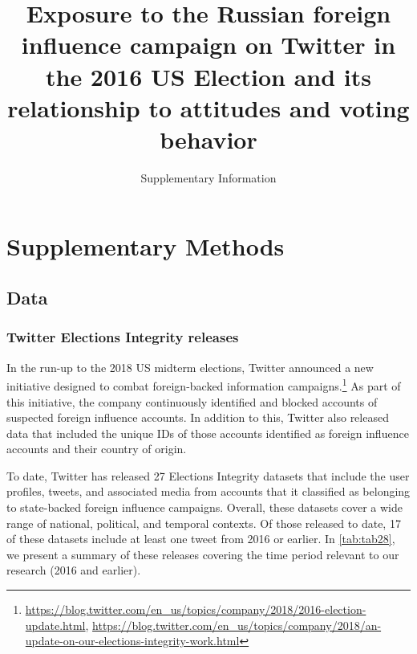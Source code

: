 \documentclass[
  12pt,
]{article}
\title{\Large \textbf{Exposure to the Russian foreign influence campaign on Twitter in the 2016 US Election and its relationship to attitudes and voting behavior}\vspace{2mm}}
\subtitle{\Large Supplementary Information}
\author{}
\date{\vspace{-2.5em}}
\begin{document}
\maketitle

{
\hypersetup{linkcolor=blue}
\setcounter{tocdepth}{2}
\tableofcontents
}
\renewcommand{\figureautorefname}{Supplementary Figure}
\renewcommand{\tableautorefname}{Supplementary Table}

\clearpage

\hypertarget{supplementary-methods}{%
\section*{Supplementary Methods}\label{supplementary-methods}}

\hypertarget{data}{%
\subsection{Data}\label{data}}

\hypertarget{twitter-elections-integrity-releases}{%
\subsubsection{Twitter Elections Integrity releases}\label{twitter-elections-integrity-releases}}

In the run-up to the 2018 US midterm elections, Twitter announced a new initiative designed to combat foreign-backed information campaigns.\footnote{\url{https://blog.twitter.com/en_us/topics/company/2018/2016-election-update.html}, \url{https://blog.twitter.com/en_us/topics/company/2018/an-update-on-our-elections-integrity-work.html}} As part of this initiative, the company continuously identified and blocked accounts of suspected foreign influence accounts. In addition to this, Twitter also released data that included the unique IDs of those accounts identified as foreign influence accounts and their country of origin.

To date, Twitter has released 27 Elections Integrity datasets that include the user profiles, tweets, and associated media from accounts that it classified as belonging to state-backed foreign influence campaigns. Overall, these datasets cover a wide range of national, political, and temporal contexts. Of those released to date, 17 of these datasets include at least one tweet from 2016 or earlier. In \autoref{tab:tab28}, we present a summary of these releases covering the time period relevant to our research (2016 and earlier).
\end{document}
